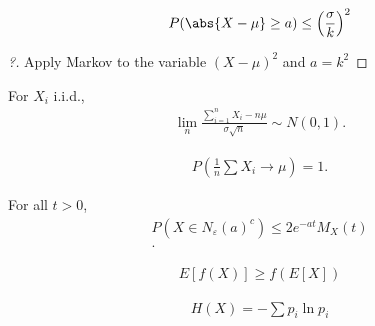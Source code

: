 \begin{proposition}

\begin{align*}
P(\abs{X - \mu} \geq a) \leq \left( \frac \sigma k \right)^2
\end{align*}

\end{proposition}

\begin{proof}[?]

Apply Markov to the variable \((X-\mu)^2\) and \(a=k^2\)

\end{proof}

\begin{theorem}

For \(X_i\) i.i.d.,
\begin{align*}  
\lim_n \frac{\sum_{i=1}^n X_i - n\mu}{\sigma \sqrt n} \sim N(0, 1)
.\end{align*}

\end{theorem}

\begin{theorem}

\begin{align*}  
P(\frac{1}{n} \sum X_i \rightarrow \mu) = 1
.\end{align*}

\end{theorem}

\begin{proposition}

For all \(t > 0\),
\begin{align*}  
P(X \in N_\varepsilon(a)^c) \leq 2 e^{-at}M_X(t) \\
.\end{align*}

\end{proposition}

\begin{proposition}

\begin{align*}
E[f(X)] \geq f(E[X])
\end{align*}

\end{proposition}

\begin{definition}[Entropy]

\begin{align*}
H(X) = - \sum p_i \ln p_i
\end{align*}

\end{definition}

